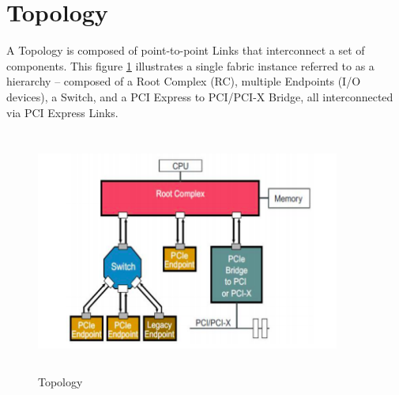 \section{Topology}

A Topology is composed of point-to-point Links that interconnect a set of components.
This figure \ref{T} illustrates a single fabric instance referred to as a hierarchy – composed of a
Root Complex (RC), multiple Endpoints (I/O devices), a Switch, and a PCI Express to
PCI/PCI-X Bridge, all interconnected via PCI Express Links.
\begin{figure}[H]
  \centering
  \includegraphics[width=100mm,height=80mm]{images/T.png}
  \caption{Topology}
  \label{T}
\end{figure}

